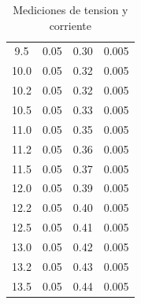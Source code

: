 \documentclass[12pt]{article}
\begin{document}
\begin{table}[htbp]
\begin{tabular}{|c|c|c|c|}
         9.5& 0.05& 0.30& 0.005\\
         10.0& 0.05& 0.32& 0.005\\
         10.2& 0.05& 0.32& 0.005\\
         10.5& 0.05& 0.33& 0.005\\
         11.0& 0.05& 0.35& 0.005\\
         11.2& 0.05& 0.36& 0.005\\
         11.5& 0.05& 0.37& 0.005\\
         12.0& 0.05& 0.39& 0.005\\
         12.2& 0.05& 0.40& 0.005\\
         12.5& 0.05& 0.41& 0.005\\
         13.0& 0.05& 0.42& 0.005\\
         13.2& 0.05& 0.43& 0.005\\
         13.5& 0.05& 0.44& 0.005\\
        \hline
    \end{tabular}
    \caption{Mediciones de tension y corriente}
    \label{tab:mediciones1}
\end{table}
\end{document}
